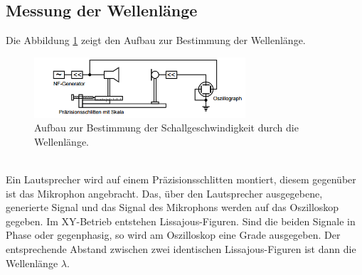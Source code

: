 \subsection{Messung der Wellenlänge}
Die Abbildung \ref{fig:schall} zeigt den Aufbau zur Bestimmung der Wellenlänge.
\begin{figure}
 \centering
 \includegraphics[width=0.7\textwidth]{schall.png}
 \caption{Aufbau zur Bestimmung der Schallgeschwindigkeit durch die Wellenlänge. \cite{skript}}
 \label{fig:schall}
 \end{figure}\\
Ein Lautsprecher wird auf einem Präzisionsschlitten montiert, diesem gegenüber ist das Mikrophon angebracht.
Das, über den Lautsprecher ausgegebene, generierte Signal und das Signal des Mikrophons werden auf das Oszilloskop gegeben.
Im XY-Betrieb entstehen Lissajous-Figuren. Sind die beiden Signale in Phase oder gegenphasig,
so wird am Oszilloskop eine Grade ausgegeben.
Der entsprechende Abstand zwischen zwei identischen Lissajous-Figuren ist dann die Wellenlänge $\lambda$.
